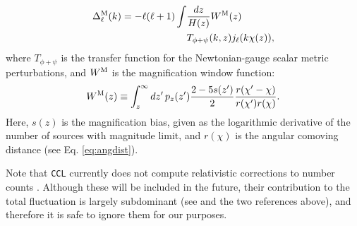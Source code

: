 \documentclass[\docopts]{\docclass}
\newcommand{\ccl}{{\tt CCL}\xspace}
\begin{document}
\begin{itemize}
        \begin{align}\nonumber
          \Delta_\ell^{\rm M}(k)=-\ell(\ell+1)\int & \frac{dz}{H(z)} W^{\rm M}(z) \\\label{eq:deltaM}
          &T_{\phi+\psi}(k,z) j_\ell(k\chi(z)),
        \end{align}
        where $T_{\phi+\psi}$ is the transfer function for the Newtonian-gauge scalar metric perturbations, and $W^{\rm M}$ is the magnification window function:
        \begin{equation}
          W^{\rm M}(z)\equiv\int_z^\infty dz'\,p_z(z')\frac{2-5s(z')}{2}\frac{r(\chi'-\chi)}{r(\chi')r(\chi)}.
        \end{equation}
        Here, $s(z)$ is the magnification bias, given as the logarithmic derivative of the number of sources with magnitude limit, and $r(\chi)$ is the angular comoving distance (see Eq. \ref{eq:angdist}).
\end{itemize}
Note that \ccl currently does not compute relativistic corrections to number counts \citep{2011PhRvD..84d3516C,2011PhRvD..84f3505B}. Although these will be included in the future, their contribution to the total fluctuation is largely subdominant (see \cite{GReffects} and the two references above), and therefore it is safe to ignore them for our purposes.
\end{document}
